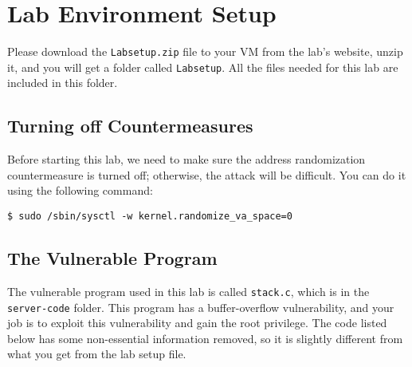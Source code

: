 
\section{Lab Environment Setup} 

Please download the \texttt{Labsetup.zip} file to your VM from the lab’s website, 
unzip it, and you will get a folder called \texttt{Labsetup}. All the files 
needed for this lab are included in this folder.


\subsection{Turning off Countermeasures} 

Before starting this lab, we need to make sure the 
address randomization countermeasure is turned off; otherwise, the 
attack will be difficult. 
You can do it using the following command:

\begin{lstlisting}
$ sudo /sbin/sysctl -w kernel.randomize_va_space=0
\end{lstlisting}
 

\subsection{The Vulnerable Program} 
\label{sec:vulnerable_program}

The vulnerable program used in this lab is called
\texttt{stack.c}, which is in the \texttt{server-code} folder.
This program has a buffer-overflow vulnerability,
and your job is to exploit this vulnerability and gain the root privilege.
The code listed below has some non-essential information removed,
so it is slightly different from what you get from the lab setup file.


